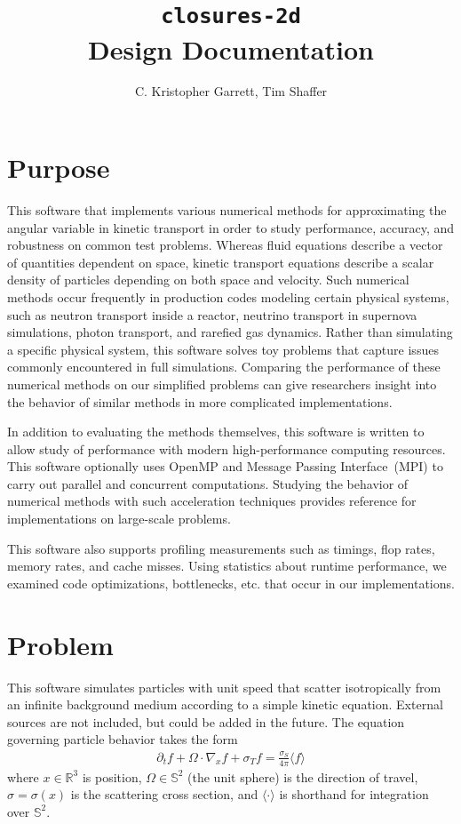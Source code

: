 \documentclass{article}
\title{\texttt{closures-2d} \\ Design Documentation}
\author{C. Kristopher Garrett, Tim Shaffer}
\newcommand{\integral}[1]{\ensuremath{\langle #1 \rangle}}
\newcommand{\twosphere}{\ensuremath{\mathbb{S}^2}\xspace}
\newcommand{\threespace}{\ensuremath{\mathbb{R}^3}\xspace}
\begin{document}
\maketitle

\section{Purpose}
This software that implements various numerical methods for
approximating the angular variable in kinetic transport in order
to study performance, accuracy, and robustness on common test problems.
Whereas fluid equations describe a vector of quantities dependent on space,
kinetic transport equations describe a scalar density of particles
depending on both space and velocity. Such numerical methods occur
frequently in production codes modeling certain physical systems, such as
neutron transport inside a reactor, neutrino transport in supernova simulations,
photon transport, and rarefied gas dynamics. Rather than simulating a
specific physical system, this software solves toy problems that capture
issues commonly encountered in full simulations. Comparing the performance of
these numerical methods on our simplified problems can give researchers
insight into the behavior of similar methods in more complicated
implementations.

In addition to evaluating the methods themselves, this
software is written to allow study of
performance with modern high-performance computing resources. This software
optionally uses OpenMP and Message Passing Interface~(MPI) to carry
out parallel and concurrent computations. Studying the behavior of
numerical methods with such acceleration techniques provides reference for
implementations on large-scale problems.

This software also supports profiling measurements such as timings, flop rates,
memory rates, and cache misses. Using statistics about runtime performance,
we examined code optimizations, bottlenecks, etc. that occur
in our implementations.

\section{Problem}
This software simulates particles with unit speed that scatter isotropically from
an infinite background medium according to a simple kinetic equation. External sources
are not included, but could be added in the future. The equation governing particle
behavior takes the form
\begin{align}
    \label{eqn:kinetic}
    \partial_t f + \Omega \cdot \nabla_x f + \sigma_T f =
    \frac{\sigma_S}{4\pi} \integral{f}
\end{align}
where $x \in \threespace$ is position, $\Omega \in \twosphere$ (the unit sphere)
is the direction of travel, $\sigma = \sigma(x)$ is the scattering cross section, and
\integral{\cdot} is shorthand for integration over \twosphere.
\end{document}
